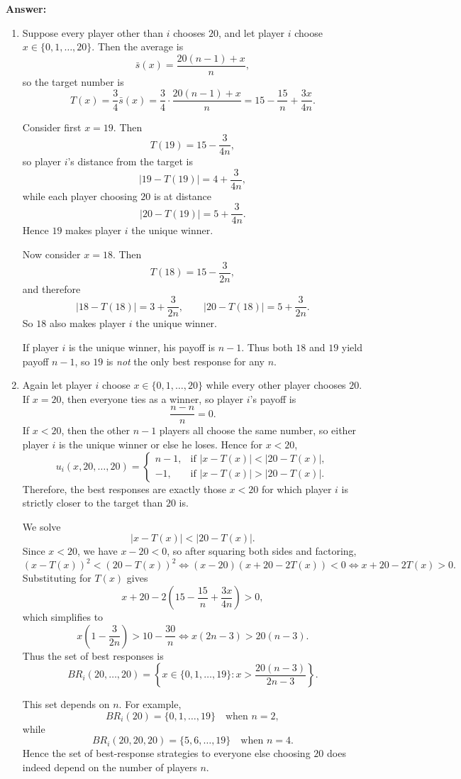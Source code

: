 \documentclass[12pt,a4paper]{article}
\begin{document}
\noindent\textbf{Answer:}
\begin{enumerate}[label=(\alph*)]
  \item Suppose every player other than $i$ chooses $20$, and let player $i$ choose $x\in\{0,1,\dots,20\}$. Then the average is
  \[
    \bar s(x)=\frac{20(n-1)+x}{n},
  \]
  so the target number is
  \[
    T(x)=\frac34\bar s(x)=\frac34\cdot\frac{20(n-1)+x}{n}=15-\frac{15}{n}+\frac{3x}{4n}.
  \]

  Consider first $x=19$. Then
  \[
    T(19)=15-\frac{3}{4n},
  \]
  so player $i$'s distance from the target is
  \[
    |19-T(19)|=4+\frac{3}{4n},
  \]
  while each player choosing $20$ is at distance
  \[
    |20-T(19)|=5+\frac{3}{4n}.
  \]
  Hence $19$ makes player $i$ the unique winner.

  Now consider $x=18$. Then
  \[
    T(18)=15-\frac{3}{2n},
  \]
  and therefore
  \[
    |18-T(18)|=3+\frac{3}{2n},
    \qquad
    |20-T(18)|=5+\frac{3}{2n}.
  \]
  So $18$ also makes player $i$ the unique winner.

  If player $i$ is the unique winner, his payoff is $n-1$. Thus both $18$ and $19$ yield payoff $n-1$, so $19$ is \emph{not} the only best response for any $n$.

  \item Again let player $i$ choose $x\in\{0,1,\dots,20\}$ while every other player chooses $20$. If $x=20$, then everyone ties as a winner, so player $i$'s payoff is
  \[
    \frac{n-n}{n}=0.
  \]
  If $x<20$, then the other $n-1$ players all choose the same number, so either player $i$ is the unique winner or else he loses. Hence for $x<20$,
  \[
    u_i(x,20,\dots,20)=
    \begin{cases}
      n-1, & \text{if } |x-T(x)|<|20-T(x)|,\\[6pt]
      -1, & \text{if } |x-T(x)|>|20-T(x)|.
    \end{cases}
  \]
  Therefore, the best responses are exactly those $x<20$ for which player $i$ is strictly closer to the target than $20$ is.

  We solve
  \[
    |x-T(x)|<|20-T(x)|.
  \]
  Since $x<20$, we have $x-20<0$, so after squaring both sides and factoring,
  \[
    (x-T(x))^2<(20-T(x))^2
    \iff (x-20)(x+20-2T(x))<0
    \iff x+20-2T(x)>0.
  \]
  Substituting for $T(x)$ gives
  \[
    x+20-2\left(15-\frac{15}{n}+\frac{3x}{4n}\right)>0,
  \]
  which simplifies to
  \[
    x\left(1-\frac{3}{2n}\right)>10-\frac{30}{n}
    \iff x(2n-3)>20(n-3).
  \]
  Thus the set of best responses is
  \[
    BR_i(20,\dots,20)=\left\{x\in\{0,1,\dots,19\}:x>\frac{20(n-3)}{2n-3}\right\}.
  \]

  This set depends on $n$. For example,
  \[
    BR_i(20)=\{0,1,\dots,19\} \quad \text{when } n=2,
  \]
  while
  \[
    BR_i(20,20,20)=\{5,6,\dots,19\} \quad \text{when } n=4.
  \]
  Hence the set of best-response strategies to everyone else choosing $20$ does indeed depend on the number of players $n$.
\end{enumerate}
\end{document}
